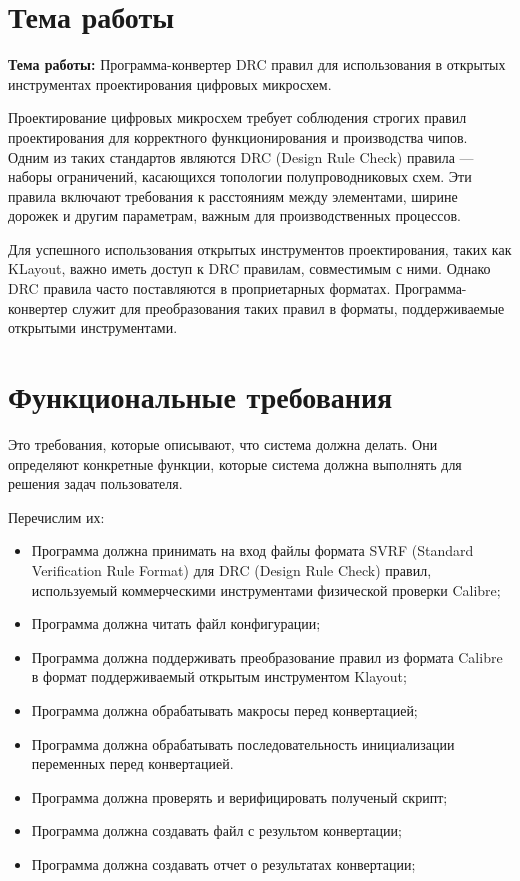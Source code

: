 \section{Тема работы}

\textbf{Тема работы:}
Программа-конвертер DRC правил для использования в открытых инструментах
проектирования цифровых микросхем.

Проектирование цифровых микросхем требует соблюдения строгих правил
проектирования для корректного функционирования и производства чипов.
Одним из таких стандартов являются DRC (Design Rule Check) правила
--- наборы ограничений, касающихся топологии полупроводниковых схем.
Эти правила включают требования к расстояниям между элементами,
ширине дорожек и другим параметрам, важным для производственных процессов.\par
Для успешного использования открытых инструментов проектирования,
таких как KLayout, важно иметь доступ к DRC правилам, совместимым с ними.
Однако DRC правила часто поставляются в проприетарных форматах.
Программа-конвертер служит для преобразования таких правил в форматы,
поддерживаемые открытыми инструментами.

\section{Функциональные требования}

Это требования, которые описывают, что система должна делать.
Они определяют конкретные функции,
которые система должна выполнять для решения задач пользователя.

Перечислим их:

\begin{itemize}
    \item Программа должна принимать на вход файлы
		формата SVRF (Standard Verification Rule Format)
		для DRC (Design Rule Check) правил,
		используемый коммерческими инструментами физической проверки
		Calibre;
	\item Программа должна читать файл конфигурации;
    \item Программа должна поддерживать преобразование правил из формата
		Calibre в формат поддерживаемый открытым инструментом Klayout;
    \item Программа должна обрабатывать макросы перед конвертацией;
    \item Программа должна обрабатывать последовательность 
		инициализации переменных перед конвертацией.
	\item Программа должна проверять и верифицировать полученый скрипт;
	\item Программа должна создавать файл с результом конвертации;
	\item Программа должна создавать отчет о результатах конвертации;
\end{itemize}

